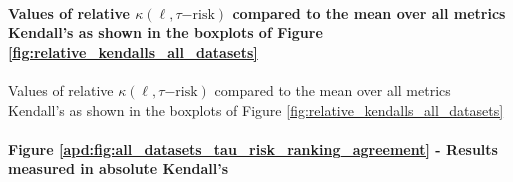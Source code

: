 \documentclass[10pt]{article}
\begin{document}
\paragraph{Values of relative $\kappa(\ell,\tau\mathrm{{-risk}})$ compared to
    the mean over all metrics Kendall's as shown in the boxplots of Figure \ref{fig:relative_kendalls_all_datasets}}

\begin{table}
    \centering
    \resizebox{0.7\textwidth}{!}{
        
    }
    \caption{Values of relative $\kappa(\ell,\tau\mathrm{{-risk}})$ compared to
        the mean over all metrics Kendall's as shown in the boxplots of Figure
        \ref{fig:relative_kendalls_all_datasets}}\label{apd:table:relative_kendalls_all_datasets}
\end{table}

\paragraph{Figure \ref{apd:fig:all_datasets_tau_risk_ranking_agreement} -
    Results measured in absolute Kendall's}
\end{document}
